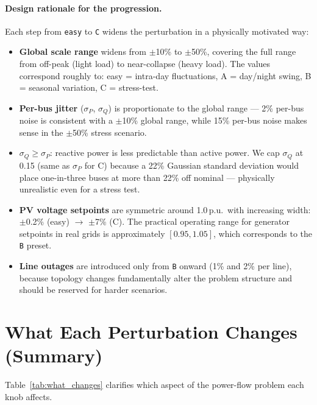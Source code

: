 \documentclass{article}
\begin{document}
\paragraph{Design rationale for the progression.}
Each step from \texttt{easy} to \texttt{C} widens the perturbation in a
physically motivated way:
\begin{itemize}[noitemsep]
  \item \textbf{Global scale range} widens from $\pm$10\% to $\pm$50\%, covering
    the full range from off-peak (light load) to near-collapse (heavy load).
    The values correspond roughly to: easy = intra-day fluctuations,
    A = day/night swing, B = seasonal variation, C = stress-test.
  \item \textbf{Per-bus jitter} ($\sigma_P$, $\sigma_Q$) is proportionate to
    the global range --- 2\% per-bus noise is consistent with a $\pm$10\%
    global range, while 15\% per-bus noise makes sense in the $\pm$50\%
    stress scenario.
  \item \textbf{$\sigma_Q \geq \sigma_P$}: reactive power is less predictable
    than active power.  We cap $\sigma_Q$ at 0.15 (same as $\sigma_P$ for C)
    because a 22\% Gaussian standard deviation would place one-in-three buses
    at more than 22\% off nominal --- physically unrealistic even for a stress test.
  \item \textbf{PV voltage setpoints} are symmetric around 1.0\,p.u.\ with
    increasing width: $\pm$0.2\% (easy) $\to$ $\pm$7\% (C).  The practical
    operating range for generator setpoints in real grids is approximately
    $[0.95, 1.05]$, which corresponds to the \texttt{B} preset.
  \item \textbf{Line outages} are introduced only from \texttt{B} onward
    (1\% and 2\% per line), because topology changes fundamentally alter the
    problem structure and should be reserved for harder scenarios.
\end{itemize}

\section{What Each Perturbation Changes (Summary)}

Table~\ref{tab:what_changes} clarifies which aspect of the power-flow problem
each knob affects.
\end{document}

